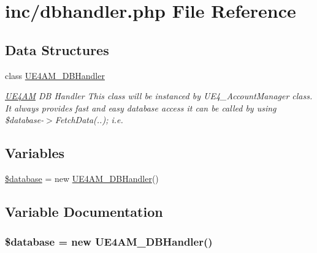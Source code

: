 \hypertarget{dbhandler_8php}{\section{inc/dbhandler.php File Reference}
\label{dbhandler_8php}
}
\subsection*{Data Structures}
\begin{DoxyCompactItemize}
\item 
class \hyperlink{class_u_e4_a_m___d_b_handler}{U\-E4\-A\-M\-\_\-\-D\-B\-Handler}
\begin{DoxyCompactList}\small\item\em \hyperlink{class_u_e4_a_m}{U\-E4\-A\-M} D\-B Handler This class will be instanced by U\-E4\-\_\-\-Account\-Manager class. It always provides fast and easy database access it can be called by using \$database-\/$>$Fetch\-Data(..); i.\-e. \end{DoxyCompactList}\end{DoxyCompactItemize}
\subsection*{Variables}
\begin{DoxyCompactItemize}
\item 
\hyperlink{dbhandler_8php_a7691c0162d89de0b6ba47edcd8ba8878}{\$database} = new \hyperlink{class_u_e4_a_m___d_b_handler}{U\-E4\-A\-M\-\_\-\-D\-B\-Handler}()
\end{DoxyCompactItemize}


\subsection{Variable Documentation}
\hypertarget{dbhandler_8php_a7691c0162d89de0b6ba47edcd8ba8878}{
\subsubsection[{\$database}]{\setlength{\rightskip}{0pt plus 5cm}\$database = new {\bf U\-E4\-A\-M\-\_\-\-D\-B\-Handler}()}}\label{dbhandler_8php_a7691c0162d89de0b6ba47edcd8ba8878}
